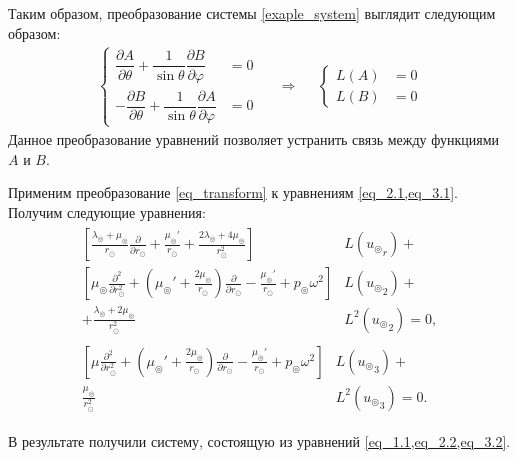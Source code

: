 Таким образом, преобразование системы \cref{exaple_system} выглядит следующим образом:
\begin{align}\label{eq_transform}
\left\{\begin{aligned}
\dfrac{\partial A}{\partial \theta} + \dfrac{1}{\sin\theta}\dfrac{\partial B}{\partial\varphi} &= 0\\
- \dfrac{\partial B}{\partial\theta} + \dfrac{1}{\sin\theta}\dfrac{\partial A}{\partial \varphi} &= 0
\end{aligned}\right. 
&& \Rightarrow && 
\left\{\begin{aligned}
L(A) &= 0\\
L(B) &= 0
\end{aligned}\right. 
\end{align}
Данное преобразование уравнений позволяет устранить связь между функциями $A$ и $B.$

Применим преобразование \cref{eq_transform} к уравнениям \cref{eq_2.1,eq_3.1}. Получим следующие уравнения:
\begin{align}
\begin{split}
\left[\frac{\lambda_\circledcirc+\mu_\circledcirc}{r_\odot}\frac{\partial}{\partial r_\odot} + \frac{\mu_\circledcirc'}{r_\odot} + \frac{2\lambda_\circledcirc+4\mu_\circledcirc}{r_\odot^2}\right]&L({u_\circledcirc}_r)+\\
\left[\mu_\circledcirc\frac{\partial^2}{\partial r_\odot^2} + \left(\mu_\circledcirc'+\frac{2\mu_\circledcirc}{r_\odot}\right)\frac{\partial}{\partial r_\odot} - \frac{\mu_\circledcirc'}{r_\odot} + p_\circledcirc\omega^2\right]&L({u_\circledcirc}_2) + \\
 + \frac{\lambda_\circledcirc+2\mu_\circledcirc}{r_\odot^2}&L^2({u_\circledcirc}_2) = 0,
\end{split}\label{eq_2.2}\\
\begin{split}
\left[\mu\frac{\partial^2}{\partial r_\odot^2} + \left(\mu_\circledcirc' + \frac{2\mu_\circledcirc}{r_\odot}\right)\frac{\partial}{\partial r_\odot} - \frac{\mu_\circledcirc'}{r_\odot} + p_\circledcirc\omega^2\right]&L({u_\circledcirc}_3) + \\
\frac{\mu_\circledcirc}{r_\odot^2}&L^2({u_\circledcirc}_3) = 0.\label{eq_3.2}
\end{split}
\end{align}

В результате получили систему, состоящую из уравнений \cref{eq_1.1,eq_2.2,eq_3.2}.


